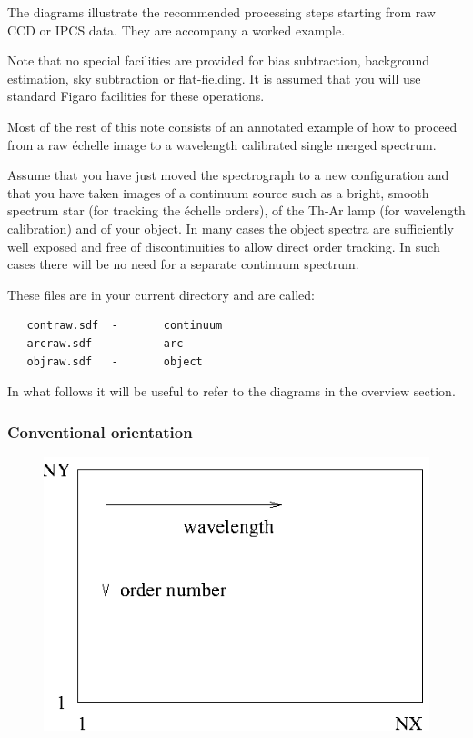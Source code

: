    The diagrams illustrate the recommended processing steps starting
   from raw CCD or IPCS data. They are accompany a worked example.

   Note that no special facilities are provided for bias subtraction,
   background estimation, sky subtraction or flat-fielding. It is
   assumed that you will use standard Figaro facilities for these
   operations.

   Most of the rest of this note consists of an annotated example of how
   to proceed from a raw \'echelle image to a wavelength calibrated
   single merged spectrum.

   Assume that you have just moved the spectrograph to a new
   configuration and that you have taken images of a continuum source
   such as a bright, smooth spectrum star (for tracking the
   \'echelle orders), of the Th-Ar lamp (for wavelength
   calibration) and of your object. In many cases the object spectra are
   sufficiently well exposed and free of discontinuities to allow direct
   order tracking. In such cases there will be no need for a separate
   continuum spectrum.

   These files are in your current directory and are called:

\begin{verbatim}
   contraw.sdf  -       continuum
   arcraw.sdf   -       arc
   objraw.sdf   -       object
\end{verbatim}

   In what follows it will be useful to refer to the diagrams in the
   overview section.


\subsubsection{\label{techno13orient}Conventional orientation}

\begin{latexonly}
\begin{figure}[htb]
\begin{center}
\includegraphics{sun86_ech5.eps}
\end{center}
\end{figure}
\end{latexonly}

